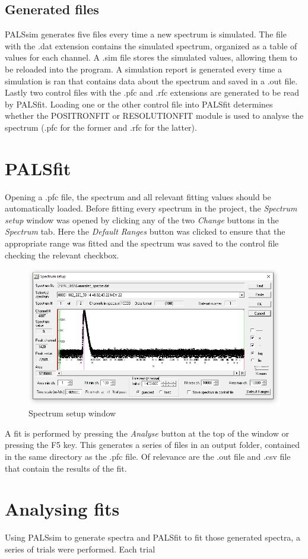 \subsection{Generated files}

PALSsim generates five files every time a new spectrum is simulated. The file with the .dat extension contains the simulated spectrum, organized as a table of values for each channel. A .sim file stores the simulated values, allowing them to be reloaded into the program. A simulation report is generated every time a simulation is ran that contains data about the spectrum and saved in a .out file. Lastly two control files with the .pfc and .rfc extensions are generated to be read by PALSfit. Loading one or the other control file into PALSfit determines whether the POSITRONFIT or RESOLUTIONFIT module is used to analyse the spectrum (.pfc for the former and .rfc for the latter).

\section{PALSfit}

Opening a .pfc file, the spectrum and all relevant fitting values should be automatically loaded. Before fitting every spectrum in the project, the \textit{Spectrum setup} window was opened by clicking any of the two \textit{Change} buttons in the \textit{Spectrum} tab. Here the \textit{Default Ranges} button was clicked to ensure that the appropriate range was fitted and the spectrum was saved to the control file checking the relevant checkbox.

\begin{figure} [h]
    \centering
    \includegraphics[width=0.63\linewidth]{SpecSetup.PNG}
    \caption{Spectrum setup window}
    \label{fig:SpecSet}
\end{figure}

A fit is performed by pressing the \textit{Analyse} button at the top of the window or pressing the F5 key. This generates a series of files in an output folder, contained in the same directory as the .pfc file. Of relevance are the .out file and .csv file that contain the results of the fit.

\section{Analysing fits}

Using PALSsim to generate spectra and PALSfit to fit those generated spectra, a series of trials were performed. Each trial 